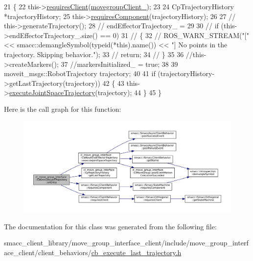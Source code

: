 \begin{DoxyCode}
21         \{
22             this->\hyperlink{classsmacc_1_1ISmaccClientBehavior_a32b16e99e3b4cb289414203dc861a440}{requiresClient}(\hyperlink{classcl__move__group__interface_1_1CbMoveEndEffectorTrajectory_aea650d3e7836125b32be97392b71a7f3}{movegroupClient\_});
23 
24             CpTrajectoryHistory *trajectoryHistory;
25             this->\hyperlink{classsmacc_1_1ISmaccClientBehavior_a19c6d658c8e809bb93bfdc9b639a3ac3}{requiresComponent}(trajectoryHistory);
26 
27             \textcolor{comment}{// this->generateTrajectory();}
28             \textcolor{comment}{// endEffectorTrajectory\_ =}
29 
30             \textcolor{comment}{// if (this->endEffectorTrajectory\_.size() == 0)}
31             \textcolor{comment}{// \{}
32             \textcolor{comment}{//     ROS\_WARN\_STREAM("[" << smacc::demangleSymbol(typeid(*this).name()) << "] No points in
       the trajectory. Skipping behavior.");}
33             \textcolor{comment}{//     return;}
34             \textcolor{comment}{// \}}
35 
36             \textcolor{comment}{//this->createMarkers();}
37             \textcolor{comment}{//markersInitialized\_ = true;}
38 
39             moveit\_msgs::RobotTrajectory trajectory;
40 
41             \textcolor{keywordflow}{if} (trajectoryHistory->getLastTrajectory(trajectory))
42             \{
43                 this->\hyperlink{classcl__move__group__interface_1_1CbMoveEndEffectorTrajectory_a3a75fa185c62591e1869427650338a32}{executeJointSpaceTrajectory}(trajectory);
44             \}
45         \}
\end{DoxyCode}
Here is the call graph for this function\+:
\nopagebreak
\begin{figure}[H]
\begin{center}
\leavevmode
\includegraphics[width=350pt]{classcl__move__group__interface_1_1CbExecuteLastTrajectory_ae38979b0c2b3f50225ff32e66cd5f0c7_cgraph}
\end{center}
\end{figure}


The documentation for this class was generated from the following file\+:\begin{DoxyCompactItemize}
\item 
smacc\+\_\+client\+\_\+library/move\+\_\+group\+\_\+interface\+\_\+client/include/move\+\_\+group\+\_\+interface\+\_\+client/client\+\_\+behaviors/\hyperlink{cb__execute__last__trajectory_8h}{cb\+\_\+execute\+\_\+last\+\_\+trajectory.\+h}\end{DoxyCompactItemize}
